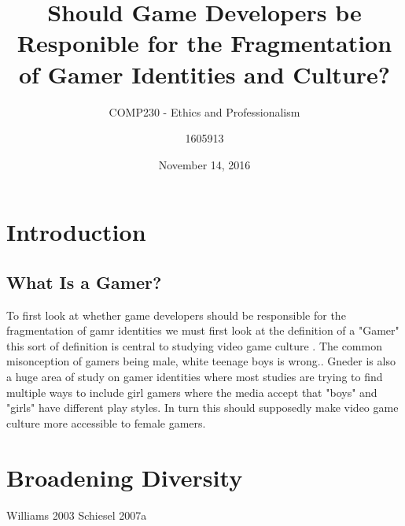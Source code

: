 \documentclass[11pt]{scrartcl}
\title{Should Game Developers be Responible for the Fragmentation of Gamer Identities and Culture?}
\date{November 14, 2016}
\subtitle{COMP230 - Ethics and Professionalism}
\author{1605913}
\begin{document}
\maketitle


\section{Introduction}

\subsection{What Is a Gamer?}
To first look at whether game developers should be responsible for the fragmentation of gamr identities we must first look at the definition of a "Gamer" this sort of definition is central to studying video game culture \cite{shaw2010video}. The common misonception of gamers being male, white teenage boys is wrong.\cite{shaw2010video}. Gneder is also a huge area of study on gamer identities where most studies are trying to find multiple ways to include girl gamers where the media accept that "boys" and "girls" have different play styles. In turn this should supposedly make video game culture more accessible to female gamers.\cite{cassell2000barbie}

\section{Broadening Diversity}
Williams 2003
Schiesel 2007a



\end{document}
